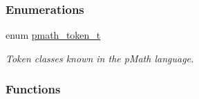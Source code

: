 \subsubsection*{Enumerations}
\begin{CompactItemize}
\item 
enum \hyperlink{group__parser_gfae0ba850f83a3a4560de57bee81e4b5}{pmath\_\-token\_\-t} 
\begin{CompactList}\small\item\em Token classes known in the pMath language. \item\end{CompactList}\end{CompactItemize}
\subsubsection*{Functions}
